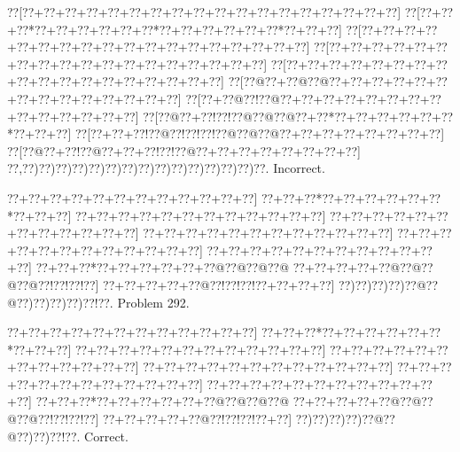 \documentclass[a5paper]{article}
\begin{document}
\begin{center}
{\goo
\0??[\0??+\0??+\0??+\0??+\0??+\0??+\0??+\0??+\0??+\0??+\0??+\0??+\0??+\0??+\0??+\0??+\0??+\0??]
\0??[\0??+\0??+\0??*\0??+\0??+\0??+\0??+\0??+\0??*\0??+\0??+\0??+\0??+\0??+\0??*\0??+\0??+\0??]
\0??[\0??+\0??+\0??+\0??+\0??+\0??+\0??+\0??+\0??+\0??+\0??+\0??+\0??+\0??+\0??+\0??+\0??+\0??]
\0??[\0??+\0??+\0??+\0??+\0??+\0??+\0??+\0??+\0??+\0??+\0??+\0??+\0??+\0??+\0??+\0??+\0??+\0??]
\0??[\0??+\0??+\0??+\0??+\0??+\0??+\0??+\0??+\0??+\0??+\0??+\0??+\0??+\0??+\0??+\0??+\0??+\0??]
\0??[\0??@\0??+\0??@\0??@\0??+\0??+\0??+\0??+\0??+\0??+\0??+\0??+\0??+\0??+\0??+\0??+\0??+\0??]
\0??[\0??+\0??@\0??!\0??@\0??+\0??+\0??+\0??+\0??+\0??+\0??+\0??+\0??+\0??+\0??+\0??+\0??+\0??]
\0??[\0??@\0??+\0??!\0??!\0??@\0??@\0??@\0??+\0??*\0??+\0??+\0??+\0??+\0??+\0??*\0??+\0??+\0??]
\0??[\0??+\0??+\0??!\0??@\0??!\0??!\0??!\0??@\0??@\0??@\0??+\0??+\0??+\0??+\0??+\0??+\0??+\0??]
\0??[\0??@\0??+\0??!\0??@\0??+\0??+\0??!\0??!\0??@\0??+\0??+\0??+\0??+\0??+\0??+\0??+\0??]
\0??,\0??)\0??)\0??)\0??)\0??)\0??)\0??)\0??)\0??)\0??)\0??)\0??)\0??)\0??)\0??.
}
Incorrect. 

\end{center}
\newpage
\begin{center}
{\goo
\0??+\0??+\0??+\0??+\0??+\0??+\0??+\0??+\0??+\0??+\0??+\0??]
\0??+\0??+\0??*\0??+\0??+\0??+\0??+\0??+\0??*\0??+\0??+\0??]
\0??+\0??+\0??+\0??+\0??+\0??+\0??+\0??+\0??+\0??+\0??+\0??]
\0??+\0??+\0??+\0??+\0??+\0??+\0??+\0??+\0??+\0??+\0??+\0??]
\0??+\0??+\0??+\0??+\0??+\0??+\0??+\0??+\0??+\0??+\0??+\0??]
\0??+\0??+\0??+\0??+\0??+\0??+\0??+\0??+\0??+\0??+\0??+\0??]
\0??+\0??+\0??+\0??+\0??+\0??+\0??+\0??+\0??+\0??+\0??+\0??]
\0??+\0??+\0??*\0??+\0??+\0??+\0??+\0??+\0??@\0??@\0??@\0??@
\0??+\0??+\0??+\0??+\0??@\0??@\0??@\0??@\0??!\0??!\0??!\0??]
\0??+\0??+\0??+\0??+\0??@\0??!\0??!\0??!\0??+\0??+\0??+\0??]
\0??)\0??)\0??)\0??)\0??@\0??@\0??)\0??)\0??)\0??)\0??!\0??.
}
Problem 292.

\end{center}
\begin{center}
{\goo
\0??+\0??+\0??+\0??+\0??+\0??+\0??+\0??+\0??+\0??+\0??+\0??]
\0??+\0??+\0??*\0??+\0??+\0??+\0??+\0??+\0??*\0??+\0??+\0??]
\0??+\0??+\0??+\0??+\0??+\0??+\0??+\0??+\0??+\0??+\0??+\0??]
\0??+\0??+\0??+\0??+\0??+\0??+\0??+\0??+\0??+\0??+\0??+\0??]
\0??+\0??+\0??+\0??+\0??+\0??+\0??+\0??+\0??+\0??+\0??+\0??]
\0??+\0??+\0??+\0??+\0??+\0??+\0??+\0??+\0??+\0??+\0??+\0??]
\0??+\0??+\0??+\0??+\0??+\0??+\0??+\0??+\0??+\0??+\0??+\0??]
\0??+\0??+\0??*\0??+\0??+\0??+\0??+\0??+\0??@\0??@\0??@\0??@
\0??+\0??+\0??+\0??+\0??@\0??@\0??@\0??@\0??!\0??!\0??!\0??]
\0??+\0??+\0??+\0??+\0??@\0??!\0??!\0??!\0??+\0??]
\0??)\0??)\0??)\0??)\0??@\0??@\0??)\0??)\0??!\0??.
}
Correct. 

\end{center}
\end{document}
